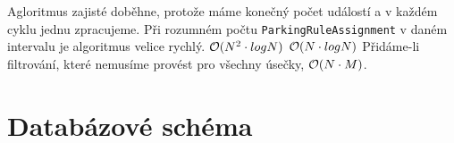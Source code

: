 Agloritmus zajisté doběhne, protože máme konečný počet událostí a v každém cyklu jednu zpracujeme.
Při rozumném počtu \texttt{ParkingRuleAssignment} v daném intervalu je algoritmus velice rychlý.
${\cal O}(N^2\cdot logN)$
${\cal O}(N\cdot logN)$
Přidáme-li filtrování, které nemusíme provést pro všechny úsečky, ${\cal O}(N\cdot M)$.

\section{Databázové schéma} \label{db_schema}

